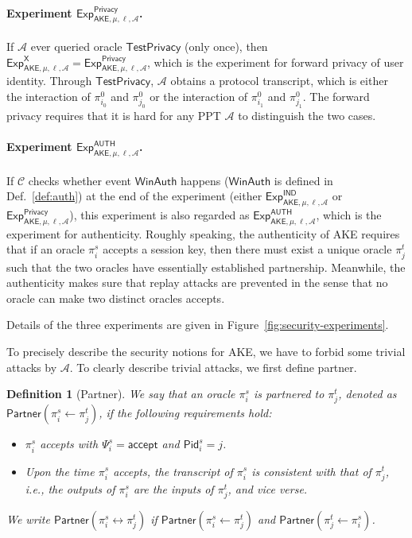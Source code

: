 \documentclass[a4paper,11pt]{article}
\newtheorem{defn}{Definition}[]
\begin{document}
\begin{sloppypar}
\paragraph{Experiment $\mathsf{Exp}^{\mathsf{Privacy}}_{\mathsf{AKE},\mu,\ell,\mathcal{A}}$.} If $\mathcal{A}$ ever queried oracle $\mathsf{TestPrivacy}$ (only once), then $\mathsf{Exp}^{\mathsf{X}}_{\mathsf{AKE},\mu,\ell,\mathcal{A}} = \mathsf{Exp}^{\mathsf{Privacy}}_{\mathsf{AKE},\mu,\ell,\mathcal{A}}$, which is the experiment for forward privacy of user identity. Through $\mathsf{TestPrivacy}$, $\mathcal{A}$ obtains a protocol transcript, which is either the interaction of $\pi^0_{i_0}$ and $\pi^0_{j_0}$ or the interaction of $\pi^0_{i_1}$ and $\pi^0_{j_1}$. The forward privacy requires that it is hard for any PPT $\mathcal{A}$ to distinguish the two cases.

\paragraph{Experiment $\mathsf{Exp}^{\mathsf{AUTH}}_{\mathsf{AKE},\mu,\ell,\mathcal{A}}$.} If $\mathcal{C}$ checks whether event $\mathsf{WinAuth}$ happens ($\mathsf{WinAuth}$ is defined in Def.~\ref{def:auth}) at the end of the experiment (either $\mathsf{Exp}^{\mathsf{IND}}_{\mathsf{AKE},\mu,\ell,\mathcal{A}}$ or $\mathsf{Exp}^{\mathsf{Privacy}}_{\mathsf{AKE},\mu,\ell,\mathcal{A}}$), this experiment is also regarded as $\mathsf{Exp}^{\mathsf{AUTH}}_{\mathsf{AKE},\mu,\ell,\mathcal{A}}$, which is the experiment for authenticity. Roughly speaking, the authenticity of AKE requires that if an oracle $\pi^s_i$ accepts a session key, then there must exist a unique oracle $\pi^t_j$ such that the two oracles have essentially established partnership. Meanwhile, the authenticity makes sure that replay attacks are prevented in the sense that no oracle can make two distinct oracles accepts.

Details of the three experiments are given in Figure~\ref{fig:security-experiments}.

To precisely describe the security notions for AKE, we have to forbid some trivial attacks by $\mathcal{A}$. To clearly describe trivial attacks, we first define partner.

\begin{defn}[Partner] \label{def:partner}
We say that an oracle $\pi^s_i$ is partnered to $\pi^t_j$, denoted as $\mathsf{Partner}(\pi^s_i \leftarrow \pi^t_j)$, if the following requirements hold:
\begin{itemize}
    \item $\pi^s_i$ accepts with $\Psi^s_i = \mathsf{accept}$ and $\mathsf{Pid}^s_i = j$.
    \item Upon the time $\pi^s_i$ accepts, the transcript of $\pi^s_i$ is consistent with that of $\pi^t_j$, i.e., the outputs of $\pi^s_i$ are the inputs of $\pi^t_j$, and vice verse.
\end{itemize}
We write $\mathsf{Partner}(\pi^s_i \leftrightarrow \pi^t_j)$ if $\mathsf{Partner}(\pi^s_i \leftarrow \pi^t_j)$ and $\mathsf{Partner}(\pi^t_j \leftarrow \pi^s_i)$.
\end{defn}


\end{sloppypar}
\end{document}

